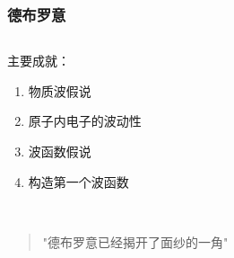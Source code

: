 \begin{frame}
    \frametitle{德布罗意}
        \begin{columns}
            \begin{column}[t]{0.46\linewidth}
                主要成就：\\
                \begin{enumerate}
                    \item 物质波假说
                    \item 原子内电子的波动性
                    \item 波函数假说 
                    \item 构造第一个波函数
                \end{enumerate}
                ~\\
                \begin{quote}
                "德布罗意已经揭开了面纱的一角"  \\
                \end{quote}  
            \end{column}
            \begin{column}[t]{0.46\linewidth}
                \begin{center}

\end{center}
\end{column}
\end{columns}
\end{frame}
